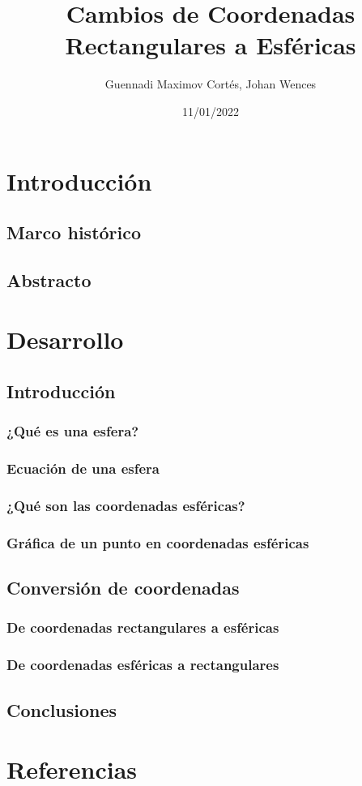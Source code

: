 \documentclass[letterpaper,14pt]{extreport} %
\title{Cambios de Coordenadas Rectangulares a Esféricas} %
\author{Guennadi Maximov Cortés, Johan Wences} %
\date{11/01/2022} %
\begin{document}
  \maketitle
  \tableofcontents
  \newpage
  
  \chapter{Introducción}
  \section{Marco histórico}
  \section{Abstracto}
  
  \chapter{Desarrollo}
  \renewcommand{\chaptername}{Jornada}
  \section{Introducción}
    \subsection{¿Qué es una esfera?}
    \subsection{Ecuación de una esfera}
    \subsection{¿Qué son las coordenadas esféricas?}
    \subsection{Gráfica de un punto en coordenadas esféricas}
  \section{Conversión de coordenadas}
    \subsection{De coordenadas rectangulares a esféricas}
    \subsection{De coordenadas esféricas a rectangulares}
  \section{Conclusiones}
  
  \chapter{Referencias}
  
\end{document}
